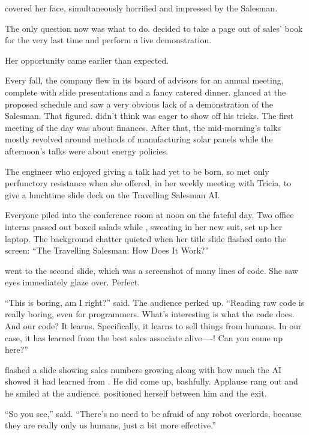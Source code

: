 {{\protag} covered her face, simultaneously horrified and impressed by the Salesman.

The only question now was what to do. {\protag} decided to take a page out of sales' book for the very last time and perform a live demonstration.

\bigbreak

Her opportunity came earlier than expected.

Every fall, the company flew in its board of advisors for an annual meeting, complete with slide presentations and a fancy catered dinner. {\protag} glanced at the proposed schedule and saw a very obvious lack of a demonstration of the Salesman. That figured. {\protag} didn't think {\energyJerk} was eager to show off his tricks. The first meeting of the day was about finances. After that, the mid-morning's talks mostly revolved around methods of manufacturing solar panels while the afternoon's talks were about energy policies.

The engineer who enjoyed giving a talk had yet to be born, so {\protag} met only perfunctory resistance when she offered, in her weekly meeting with Tricia, to give a lunchtime slide deck on the Travelling Salesman AI.

Everyone piled into the conference room at noon on the fateful day. Two office interns passed out boxed salads while {\protag}, sweating in her new suit, set up her laptop. The background chatter quieted when her title slide flashed onto the screen: ``The Travelling Salesman: How Does It Work?''

{\protag} went to the second slide, which was a screenshot of many lines of code. She saw eyes immediately glaze over. Perfect.

``This is boring, am I right?'' {\protag} said. The audience perked up. ``Reading raw code is really boring, even for programmers. What's interesting is what the code does. And our code? It learns. Specifically, it learns to sell things from humans. In our case, it has learned from the best sales associate alive----{\energyJerk}! Can you come up here?''

{\protag} flashed a slide showing sales numbers growing along with how much the AI showed it had learned from {\energyJerk}. He did come up, bashfully. Applause rang out and he smiled at the audience. {\protag} positioned herself between him and the exit.

``So you see,'' {\protag} said. ``There's no need to be afraid of any robot overlords, because they are really only us humans, just a bit more effective.''

}
